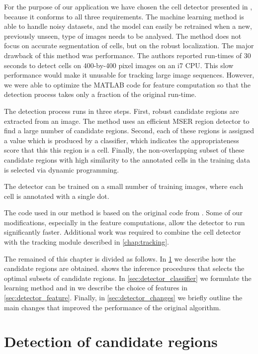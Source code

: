 	For the purpose of our application we have chosen the cell detector presented in \cite{arteta12}, because it conforms to all three requirements. The machine learning method is able to handle noisy datasets, and the model can easily be retrained when a new, previously unseen, type of images needs to be analysed. The method does not focus on accurate segmentation of cells, but on the robust localization. The major drawback of this method was performance. The authors reported run-times of 30 seconds to detect cells on 400-by-400 pixel images on an i7 CPU. This slow performance would make it unusable for tracking large image sequences. However, we were able to optimize the MATLAB code for feature computation so that the detection process takes only a fraction of the original run-time.
	
	The detection process runs in three steps. First, robust candidate regions are extracted from an image. The method uses an efficient MSER region detector \cite{matas04} to find a large number of candidate regions. Second, each of these regions is assigned a value which is produced by a classifier, which indicates the appropriateness score that this this region is a cell. Finally, the non-overlapping subset of these candidate regions with high similarity to the annotated cells in the training data is selected via dynamic programming.
	
	The detector can be trained on a small number of training images, where each cell is  annotated with a single dot. 

	The code used in our method is based on the original code from \cite{arteta12}. Some of our modifications, especially in the feature computations, allow the detector to run significantly faster. Additional work was required to combine the cell detector with the tracking module described in \cref{chap:tracking}.
	
	The remained of this chapter is divided as follows. In \cref{sec:detector_extremal} we describe how the candidate regions are obtained.  shows the inference procedures that selects the optimal subsets of candidate regions. In \cref{sec:detector_classifier} we formulate the learning method and in we describe the choice of features in \cref{sec:detector_feature}. Finally, in \cref{sec:detector_changes} we briefly outline the main changes that improved the performance of the original algorithm.
	
	\section{Detection of candidate regions \statusfirstdraft}
	\label{sec:detector_extremal}
	
